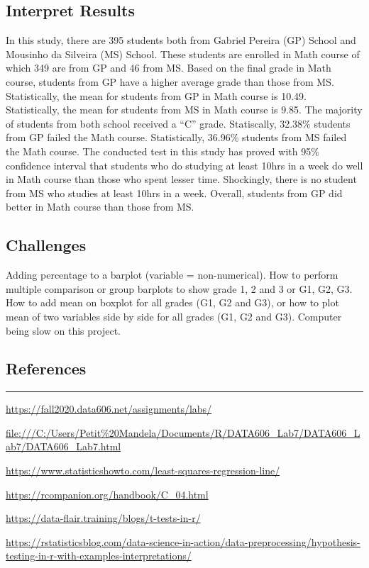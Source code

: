 \documentclass[
]{article}
\begin{document}
\hypertarget{interpret-results}{%
\subsection{Interpret Results}\label{interpret-results}}

In this study, there are 395 students both from Gabriel Pereira (GP)
School and Mousinho da Silveira (MS) School. These students are enrolled
in Math course of which 349 are from GP and 46 from MS. Based on the
final grade in Math course, students from GP have a higher average grade
than those from MS. Statistically, the mean for students from GP in Math
course is 10.49. Statistically, the mean for students from MS in Math
course is 9.85. The majority of students from both school received a
``C'' grade. Statiscally, 32.38\% students from GP failed the Math
course. Statistically, 36.96\% students from MS failed the Math course.
The conducted test in this study has proved with 95\% confidence
interval that students who do studying at least 10hrs in a week do well
in Math course than those who spent lesser time. Shockingly, there is no
student from MS who studies at least 10hrs in a week. Overall, students
from GP did better in Math course than those from MS.

\hypertarget{challenges}{%
\subsection{Challenges}\label{challenges}}

Adding percentage to a barplot (variable = non-numerical). How to
perform multiple comparison or group barplots to show grade 1, 2 and 3
or G1, G2, G3. How to add mean on boxplot for all grades (G1, G2 and
G3), or how to plot mean of two variables side by side for all grades
(G1, G2 and G3). Computer being slow on this project.

\hypertarget{references}{%
\subsection{References}\label{references}}

\begin{center}\rule{0.5\linewidth}{0.5pt}\end{center}

\url{https://fall2020.data606.net/assignments/labs/}

\url{file:///C:/Users/Petit\%20Mandela/Documents/R/DATA606_Lab7/DATA606_Lab7/DATA606_Lab7.html}

\url{https://www.statisticshowto.com/least-squares-regression-line/}

\url{https://rcompanion.org/handbook/C_04.html}

\url{https://data-flair.training/blogs/t-tests-in-r/}

\url{https://rstatisticsblog.com/data-science-in-action/data-preprocessing/hypothesis-testing-in-r-with-examples-interpretations/}
\end{document}
